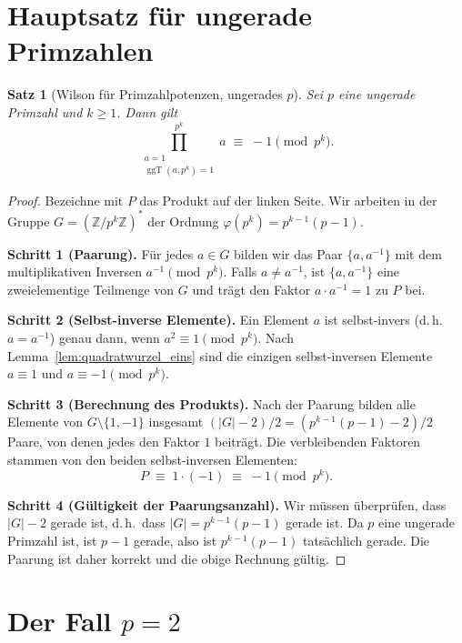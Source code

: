 \documentclass[12pt,a4paper]{amsart}
\newtheorem{theorem}{Satz}[section]
\theoremstyle{definition}
\newcommand{\Z}{\mathbb{Z}}
\DeclareMathOperator{\ggT}{ggT}
\begin{document}
\section{Hauptsatz für ungerade Primzahlen}

\begin{theorem}[Wilson für Primzahlpotenzen, ungerades $p$]\label{satz:wilson_pk_ungerade}
  Sei $p$ eine ungerade Primzahl und $k \geq 1$. Dann gilt
  \[
    \prod_{\substack{a=1\\\ggT(a,p^k)=1}}^{p^k} a
    \;\equiv\; -1 \pmod{p^k}.
  \]
\end{theorem}

\begin{proof}
  Bezeichne mit $P$ das Produkt auf der linken Seite. Wir arbeiten in der
  Gruppe $G = (\Z/p^k\Z)^*$ der Ordnung $\varphi(p^k) = p^{k-1}(p-1)$.

  \textbf{Schritt 1 (Paarung).}
  Für jedes $a \in G$ bilden wir das Paar $\{a, a^{-1}\}$ mit dem
  multiplikativen Inversen $a^{-1} \pmod{p^k}$. Falls $a \neq a^{-1}$,
  ist $\{a, a^{-1}\}$ eine zweielementige Teilmenge von $G$ und trägt den
  Faktor $a \cdot a^{-1} = 1$ zu $P$ bei.

  \textbf{Schritt 2 (Selbst-inverse Elemente).}
  Ein Element $a$ ist selbst-invers (d.\,h.\ $a = a^{-1}$) genau dann, wenn
  $a^2 \equiv 1 \pmod{p^k}$. Nach Lemma~\ref{lem:quadratwurzel_eins} sind die
  einzigen selbst-inversen Elemente $a \equiv 1$ und $a \equiv -1 \pmod{p^k}$.

  \textbf{Schritt 3 (Berechnung des Produkts).}
  Nach der Paarung bilden alle Elemente von $G \setminus \{1, -1\}$
  insgesamt $(|G| - 2)/2 = (p^{k-1}(p-1) - 2)/2$ Paare, von denen jedes
  den Faktor $1$ beiträgt. Die verbleibenden Faktoren stammen von den beiden
  selbst-inversen Elementen:
  \[
    P \;\equiv\; 1 \cdot (-1) \;\equiv\; -1 \pmod{p^k}.
  \]

  \textbf{Schritt 4 (Gültigkeit der Paarungsanzahl).}
  Wir müssen überprüfen, dass $|G| - 2$ gerade ist, d.\,h.\ dass
  $|G| = p^{k-1}(p-1)$ gerade ist. Da $p$ eine ungerade Primzahl ist,
  ist $p - 1$ gerade, also ist $p^{k-1}(p-1)$ tatsächlich gerade.
  Die Paarung ist daher korrekt und die obige Rechnung gültig.
\end{proof}

\section{Der Fall \texorpdfstring{$p = 2$}{p = 2}}
\end{document}
